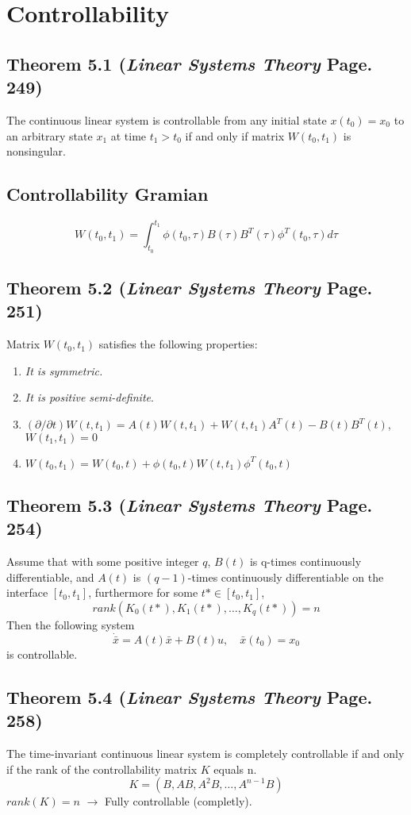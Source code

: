 \documentclass[12pt]{article}
\begin{document}
\section*{Controllability}
\subsection*{Theorem 5.1 ({\em Linear Systems Theory} Page. 249)}
The continuous linear system is controllable from any initial state $x(t_0)=x_0$ to an arbitrary state $x_1$ at time $t_1>t_0$ if and only if matrix $W(t_0,t_1)$ is nonsingular.

\subsection*{Controllability Gramian}
$$W(t_0,t_1)=\int_{t_0}^{t_1}\phi(t_0,\tau)B(\tau)B^T(\tau)\phi^T(t_0,\tau)d\tau$$

\subsection*{Theorem 5.2 ({\em Linear Systems Theory} Page. 251)}
Matrix $W(t_0,t_1)$ satisfies the following properties:
\renewcommand{\labelenumiii}{\Roman{enumii}}
\begin{enumerate}
  \item {\em It is symmetric.}
  \item {\em It is positive semi-definite}. 
  \item $(\partial/\partial t)W(t,t_1)=A(t)W(t,t_1)+W(t,t_1)A^T(t)-B(t)B^T(t)$, \\$W(t_1,t_1)=0$
  \item $W(t_0,t_1)=W(t_0,t)+\phi(t_0,t)W(t,t_1)\phi^T(t_0,t)$
\end{enumerate}

\subsection*{Theorem 5.3 ({\em Linear Systems Theory} Page. 254)}
Assume that with some positive integer $q$, $B(t)$ is q-times continuously differentiable, and $A(t)$ is $(q-1)$-times continuously differentiable on the interface $[t_0,t_1]$, furthermore for some $t*\in [t_0,t_1]$,
$$rank(K_0(t*),K_1(t*),\dots,K_q(t*))=n$$
Then the following system
$$\dot{\bar{x}}=A(t)\bar{x}+B(t)u,\quad \bar{x}(t_0)=x_0$$
is controllable. 

\subsection*{Theorem 5.4 ({\em Linear Systems Theory} Page. 258)}
The time-invariant continuous linear system is completely controllable if and only if the rank of the controllability matrix $K$ equals n.
$$K=(B,AB,A^2B,\dots,A^{n-1}B)$$
$rank(K)=n$ $\rightarrow$ Fully controllable (completly).
 
\end{document}
